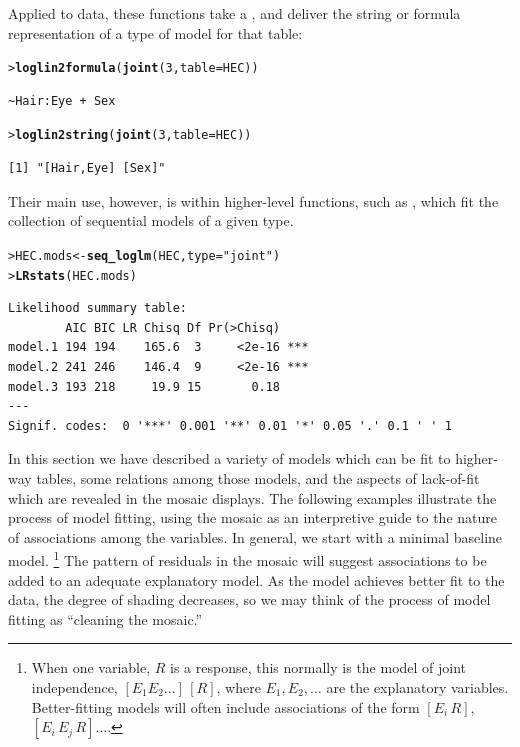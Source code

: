 \documentclass[10pt,krantz2]{krantz}\usepackage[]{graphicx}\usepackage[]{color}
\makeatletter
\newcommand{\hlnum}[1]{\textcolor[rgb]{0.686,0.059,0.569}{#1}}%
\newcommand{\hlstr}[1]{\textcolor[rgb]{0.192,0.494,0.8}{#1}}%
\newcommand{\hlstd}[1]{\textcolor[rgb]{0.345,0.345,0.345}{#1}}%
\newcommand{\hlkwb}[1]{\textcolor[rgb]{0.69,0.353,0.396}{#1}}%
\newcommand{\hlkwc}[1]{\textcolor[rgb]{0.333,0.667,0.333}{#1}}%
\newcommand{\hlkwd}[1]{\textcolor[rgb]{0.737,0.353,0.396}{\textbf{#1}}}%
\newenvironment{kframe}{%
 \def\at@end@of@kframe{}%
 \ifinner\ifhmode%
  \def\at@end@of@kframe{\end{minipage}}%
  \begin{minipage}{\columnwidth}%
 \fi\fi%
 \def\FrameCommand##1{\hskip\@totalleftmargin \hskip-\fboxsep
 \colorbox{shadecolor}{##1}\hskip-\fboxsep
     \hskip-\linewidth \hskip-\@totalleftmargin \hskip\columnwidth}%
 \MakeFramed {\advance\hsize-\width
   \@totalleftmargin\z@ \linewidth\hsize
   \@setminipage}}%
 {\par\unskip\endMakeFramed%
 \at@end@of@kframe}
\newenvironment{knitrout}{}{} %
\renewenvironment{knitrout}{\small\renewcommand{\baselinestretch}{.85}}{} %
\makeatother
\begin{document}
Applied to data, these functions take a , and deliver
the string or formula representation of a type of model for that table:
\begin{knitrout}
\color{fgcolor}\begin{kframe}
\begin{alltt}
\hlstd{> }\hlkwd{loglin2formula}\hlstd{(}\hlkwd{joint}\hlstd{(}\hlnum{3}\hlstd{,} \hlkwc{table} \hlstd{= HEC))}
\end{alltt}
\begin{verbatim}
~Hair:Eye + Sex
\end{verbatim}
\begin{alltt}
\hlstd{> }\hlkwd{loglin2string}\hlstd{(}\hlkwd{joint}\hlstd{(}\hlnum{3}\hlstd{,} \hlkwc{table} \hlstd{= HEC))}
\end{alltt}
\begin{verbatim}
[1] "[Hair,Eye] [Sex]"
\end{verbatim}
\end{kframe}
\end{knitrout}
Their main use, however, is within higher-level functions,
such as , which fit the collection of sequential models
of a given type.
\begin{knitrout}
\color{fgcolor}\begin{kframe}
\begin{alltt}
\hlstd{> }\hlstd{HEC.mods} \hlkwb{<-} \hlkwd{seq_loglm}\hlstd{(HEC,} \hlkwc{type} \hlstd{=} \hlstr{"joint"}\hlstd{)}
\hlstd{> }\hlkwd{LRstats}\hlstd{(HEC.mods)}
\end{alltt}
\begin{verbatim}
Likelihood summary table:
        AIC BIC LR Chisq Df Pr(>Chisq)    
model.1 194 194    165.6  3     <2e-16 ***
model.2 241 246    146.4  9     <2e-16 ***
model.3 193 218     19.9 15       0.18    
---
Signif. codes:  0 '***' 0.001 '**' 0.01 '*' 0.05 '.' 0.1 ' ' 1
\end{verbatim}
\end{kframe}
\end{knitrout}

In this section we have described a variety of models which can be fit
to higher-way tables, some relations among those models, and the aspects
of lack-of-fit which are revealed in the mosaic displays.
The following examples illustrate the process of model fitting,
using the mosaic as an interpretive guide to the nature of associations
among the variables.
In general, we start with a minimal baseline model.%
%
\footnote{When one variable, $R$
is a response, this normally is the model of joint independence,
\([E_1 E_2 \dots] \, [R]\), where \(E_1, E_2, \dots\) are the explanatory
variables.  Better-fitting models will often include associations
of the form \([E_i \, R]\), \([E_i \, E_j \, R] \dots \).
}
The pattern of residuals in the mosaic will suggest associations to be added
to an adequate explanatory model.
As the model achieves better fit to the data, the degree of shading
decreases, so we may think of the process of model fitting as
``cleaning the mosaic.''
\end{document}
